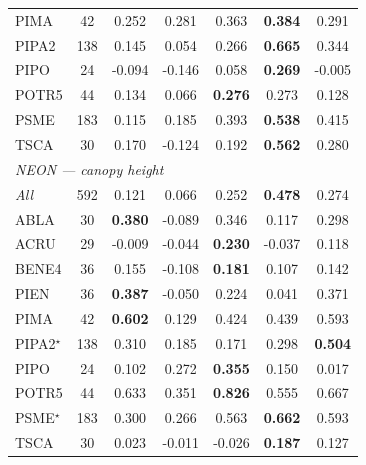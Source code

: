 \documentclass[lettersize,journal]{IEEEtran}
\begin{document}
\begin{table}[t]
{\begin{tabular}{l c c c c c c}
PIMA & 42 & 0.252 & 0.281 & 0.363 & \textbf{0.384} & 0.291 \\
PIPA2 & 138 & 0.145 & 0.054 & 0.266 & \textbf{0.665} & 0.344 \\
PIPO & 24 & -0.094 & -0.146 & 0.058 & \textbf{0.269} & -0.005 \\
POTR5 & 44 & 0.134 & 0.066 & \textbf{0.276} & 0.273 & 0.128 \\
PSME & 183 & 0.115 & 0.185 & 0.393 & \textbf{0.538} & 0.415 \\
TSCA & 30 & 0.170 & -0.124 & 0.192 & \textbf{0.562} & 0.280 \\
\midrule
\multicolumn{7}{l}{\emph{NEON --- canopy height}} \\
\emph{All} & 592 & 0.121 & 0.066 & 0.252 & \textbf{0.478} & 0.274 \\
ABLA & 30 & \textbf{0.380} & -0.089 & 0.346 & 0.117 & 0.298 \\
ACRU & 29 & -0.009 & -0.044 & \textbf{0.230} & -0.037 & 0.118 \\
BENE4 & 36 & 0.155 & -0.108 & \textbf{0.181} & 0.107 & 0.142 \\
PIEN & 36 & \textbf{0.387} & -0.050 & 0.224 & 0.041 & 0.371 \\
PIMA & 42 & \textbf{0.602} & 0.129 & 0.424 & 0.439 & 0.593 \\
PIPA2$^\star$ & 138 & 0.310 & 0.185 & 0.171 & 0.298 & \textbf{0.504} \\
PIPO & 24 & 0.102 & 0.272 & \textbf{0.355} & 0.150 & 0.017 \\
POTR5 & 44 & 0.633 & 0.351 & \textbf{0.826} & 0.555 & 0.667 \\
PSME$^\star$ & 183 & 0.300 & 0.266 & 0.563 & \textbf{0.662} & 0.593 \\
TSCA & 30 & 0.023 & -0.011 & -0.026 & \textbf{0.187} & 0.127 \\
\bottomrule
\end{tabular}
}
\end{table}
\end{document}
